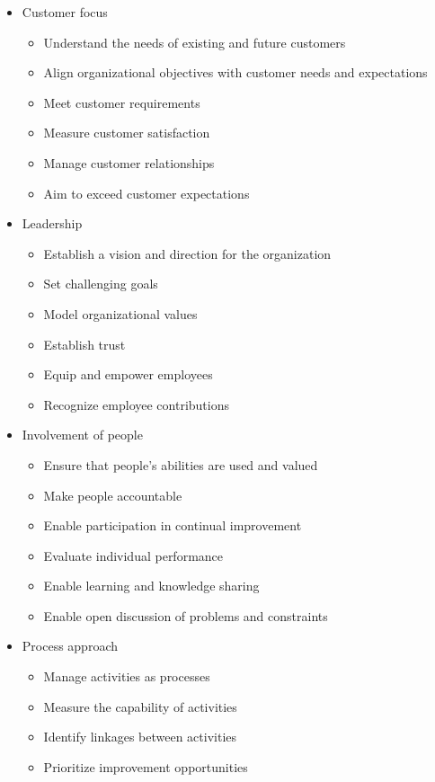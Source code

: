 \documentclass{article}
\begin{document}
\begin{itemize}
  \item Customer focus
  \begin{itemize}
    \item Understand the needs of existing and future customers
    \item Align organizational objectives with customer needs and expectations
    \item Meet customer requirements
    \item Measure customer satisfaction
    \item Manage customer relationships
    \item Aim to exceed customer expectations
  \end{itemize}
  \item Leadership
  \begin{itemize}
    \item Establish a vision and direction for the organization
    \item Set challenging goals
    \item Model organizational values
    \item Establish trust
    \item Equip and empower employees
    \item Recognize employee contributions
  \end{itemize}
  \item Involvement of people
  \begin{itemize}
    \item Ensure that people’s abilities are used and valued
    \item Make people accountable
    \item Enable participation in continual improvement
    \item Evaluate individual performance
    \item Enable learning and knowledge sharing
    \item Enable open discussion of problems and constraints
    \end{itemize}  
  \item Process approach
  \begin{itemize}
    \item Manage activities as processes
    \item Measure the capability of activities
    \item Identify linkages between activities
    \item Prioritize improvement opportunities

\end{itemize}
\end{itemize}
\end{document}
